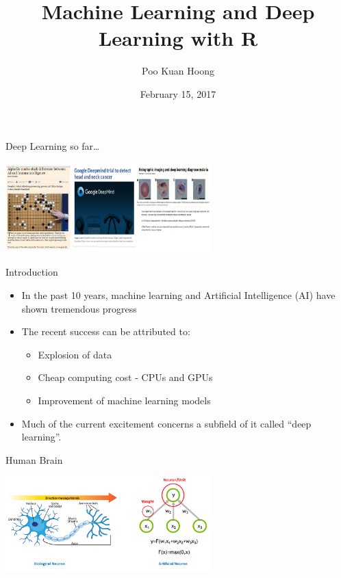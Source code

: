 \documentclass[ignorenonframetext,]{beamer}
\title{Machine Learning and Deep Learning with R}
\author{Poo Kuan Hoong}
\date{February 15, 2017}
\providecommand{\tightlist}{%
\setlength{\itemsep}{0pt}\setlength{\parskip}{0pt}}
\begin{document}
\frame{\titlepage}

\begin{frame}{Deep Learning so far\ldots{}}

\includegraphics[width=300px]{images/deep_learning}

\end{frame}

\begin{frame}{Introduction}

\begin{itemize}
\tightlist
\item
  In the past 10 years, machine learning and Artificial Intelligence
  (AI) have shown tremendous progress
\item
  The recent success can be attributed to:

  \begin{itemize}
  \tightlist
  \item
    Explosion of data
  \item
    Cheap computing cost - CPUs and GPUs
  \item
    Improvement of machine learning models
  \end{itemize}
\item
  Much of the current excitement concerns a subfield of it called ``deep
  learning''.
\end{itemize}

\end{frame}

\begin{frame}{Human Brain}

\includegraphics[width=300px]{images/brain}

\end{frame}
\end{document}
